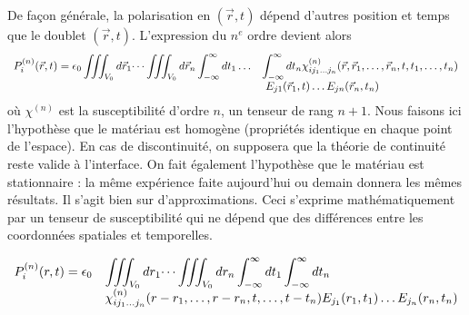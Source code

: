 	De façon générale, la polarisation en $(\vec{r},t)$ dépend d'autres position et temps
	que le doublet $(\vec{r},t)$. L'expression du $n^e$ ordre devient alors
	\begin{equation}
	\begin{array}{ll}
	\DS P_i^{(n)}(\vec{r},t) = \epsilon_0\iiint_{V_0}d\vec{r}_1\dots\iiint_{V_0}d\vec{r}_n
	\int_{-\infty}^\infty dt_1\dots&\DS \int_{-\infty}^\infty dt_n \chi_{ij_{1}\dots j_n}^{(n)}
	(\vec r, \vec r_1,\dots, \vec{r}_n, t, t_1,\dots,t_n)\\ &\DS\ E_{j1}(\vec{r}_1,t)\dots 
	E_{jn}(\vec{r}_n,t_n)
	\end{array}
	\end{equation}
	où $\chi^{(n)}$ est la susceptibilité d'ordre $n$, un tenseur de rang $n+1$. Nous faisons
	ici l'hypothèse que le matériau est homogène (propriétés identique en chaque point de 
	l'espace). En cas de discontinuité, on supposera que la théorie de continuité reste valide
	à l'interface. On fait également l'hypothèse que le matériau est stationnaire : la même 
	expérience faite aujourd'hui ou demain donnera les mêmes résultats. Il s'agit bien sur 
	d'approximations. Ceci s'exprime mathématiquement par un tenseur de susceptibilité qui ne
	dépend que des différences entre les coordonnées spatiales et temporelles.
	
	\begin{equation}
	\begin{array}{ll}
	\displaystyle P_i^{(n)}(r,t) =\epsilon_0&\displaystyle\iiint_{V_0}dr_1\dots \iiint_{V_0} dr_n \int_{-\infty}^
	\infty dt_1\int_{-\infty}^	\infty dt_n\\
	&\displaystyle \chi_{ij_1\dots j_n}^{(n)}(r-r_1,\dots,r-r_n,t,\dots,t-t_n)E_{j_1}(r_1,t_1)\dots
	E_{j_n}(r_n,t_n)
	\end{array}
	\end{equation}